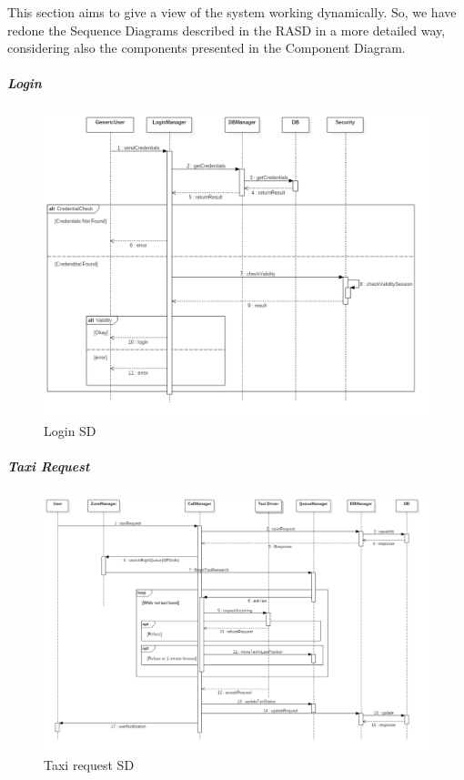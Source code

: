 This section aims to give a view of the system working dynamically. So, we have redone the Sequence Diagrams described in the RASD in a more detailed way, considering also the components presented in the Component Diagram.

\subparagraph{Login}
    \begin{figure}[H]
        \centering
        \includegraphics[width=\textwidth, angle =90]{./Images/SD_Login.png}
        \caption{Login SD}
    \end{figure}

\subparagraph{Taxi Request}
    \begin{figure}[H]
        \centering
        \includegraphics[width=\textwidth, angle =90]{./Images/SD_Request.png}
        \caption{Taxi request SD}
    \end{figure}
    
\newpage